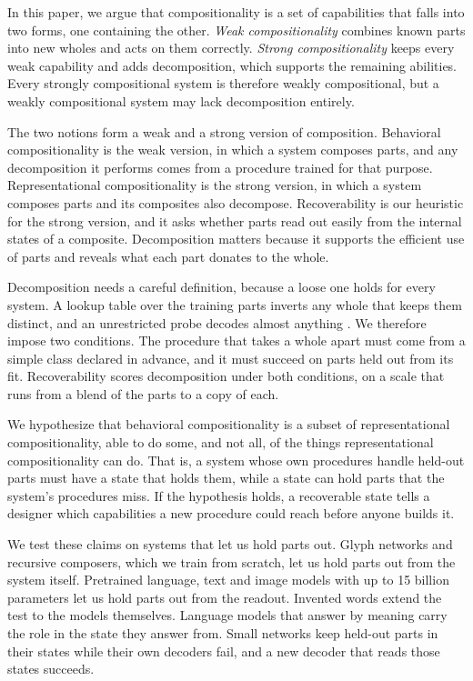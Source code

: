 In this paper, we argue that compositionality is a set of capabilities that falls into two forms, one containing the other. \emph{Weak compositionality} combines known parts into new wholes and acts on them correctly. \emph{Strong compositionality} keeps every weak capability and adds decomposition, which supports the remaining abilities. Every strongly compositional system is therefore weakly compositional, but a weakly compositional system may lack decomposition entirely.

The two notions form a weak and a strong version of composition. Behavioral compositionality is the weak version, in which a system composes parts, and any decomposition it performs comes from a procedure trained for that purpose. Representational compositionality is the strong version, in which a system composes parts and its composites also decompose. Recoverability is our heuristic for the strong version, and it asks whether parts read out easily from the internal states of a composite. Decomposition matters because it supports the efficient use of parts and reveals what each part donates to the whole.

Decomposition needs a careful definition, because a loose one holds for every system. A lookup table over the training parts inverts any whole that keeps them distinct, and an unrestricted probe decodes almost anything \citep{hewitt2019}. We therefore impose two conditions. The procedure that takes a whole apart must come from a simple class declared in advance, and it must succeed on parts held out from its fit. Recoverability scores decomposition under both conditions, on a scale that runs from a blend of the parts to a copy of each.

We hypothesize that behavioral compositionality is a subset of representational compositionality, able to do some, and not all, of the things representational compositionality can do. That is, a system whose own procedures handle held-out parts must have a state that holds them, while a state can hold parts that the system's procedures miss. If the hypothesis holds, a recoverable state tells a designer which capabilities a new procedure could reach before anyone builds it.

We test these claims on systems that let us hold parts out. Glyph networks and recursive composers, which we train from scratch, let us hold parts out from the system itself. Pretrained language, text and image models with up to 15 billion parameters let us hold parts out from the readout. Invented words extend the test to the models themselves. Language models that answer by meaning carry the role in the state they answer from. Small networks keep held-out parts in their states while their own decoders fail, and a new decoder that reads those states succeeds.


